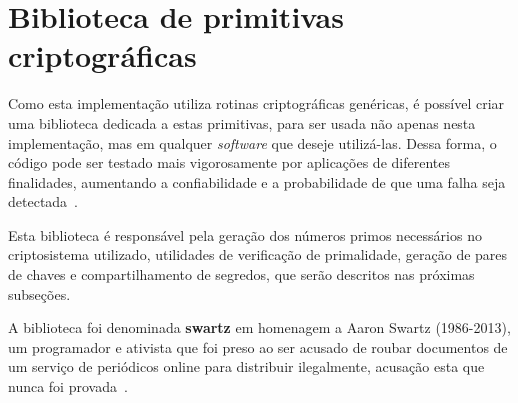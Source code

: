 \section{Biblioteca de primitivas criptográficas}

Como esta implementação utiliza rotinas criptográficas genéricas, é possível
criar uma biblioteca dedicada a estas primitivas, para ser usada não apenas
nesta implementação, mas em qualquer \textit{software} que deseje utilizá-las.
Dessa forma, o código pode ser testado mais vigorosamente por aplicações de
diferentes finalidades, aumentando a confiabilidade e a probabilidade de que
uma falha seja detectada~\cite{hursch1995separation}.

Esta biblioteca é responsável pela geração dos números primos necessários no
criptosistema utilizado, utilidades de verificação de primalidade, geração de
pares de chaves e compartilhamento de segredos, que serão descritos nas
próximas subseções.

A biblioteca foi denominada \textbf{swartz} em homenagem a Aaron Swartz
(1986-2013), um programador e ativista que foi preso ao ser acusado de roubar
documentos de um serviço de periódicos online para distribuir ilegalmente,
acusação esta que nunca foi provada~\cite{sims2011library}.



